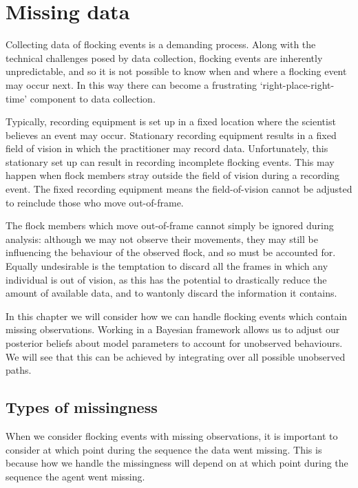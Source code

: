 \graphicspath{{fig/missing/}}

\chapter{Missing data}
\label{cha:missing}

Collecting data of flocking events is a demanding process. Along with the
technical challenges posed by data collection, flocking events are inherently
unpredictable, and so it is not possible to know when and where a flocking
event may occur next. In this way there can become a frustrating
`right-place-right-time' component to data collection.

Typically, recording equipment is set up in a fixed location where the
scientist believes an event may occur. Stationary recording equipment results
in a fixed field of vision in which the practitioner may record data.
Unfortunately, this stationary set up can result in recording incomplete
flocking events. This may happen when flock members stray outside the field of
vision during a recording event. The fixed recording equipment means the
field-of-vision cannot be adjusted to reinclude those who move out-of-frame.

The flock members which move out-of-frame cannot simply be ignored during
analysis: although we may not observe their movements, they may still be
influencing the behaviour of the observed flock, and so must be accounted for.
Equally undesirable is the temptation to discard all the frames in which any
individual is out of vision, as this has the potential to drastically reduce
the amount of available data, and to wantonly discard the information it
contains.

In this chapter we will consider how we can handle flocking events which
contain missing observations. Working in a Bayesian framework allows us to
adjust our posterior beliefs about model parameters to account for unobserved
behaviours. We will see that this can be achieved by integrating over all 
possible unobserved paths.

\section{Types of missingness}

When we consider flocking events with missing observations, it is important to
consider at which point during the sequence the data went missing. This is
because how we handle the missingness will depend on at which point during the
sequence the agent went missing.

